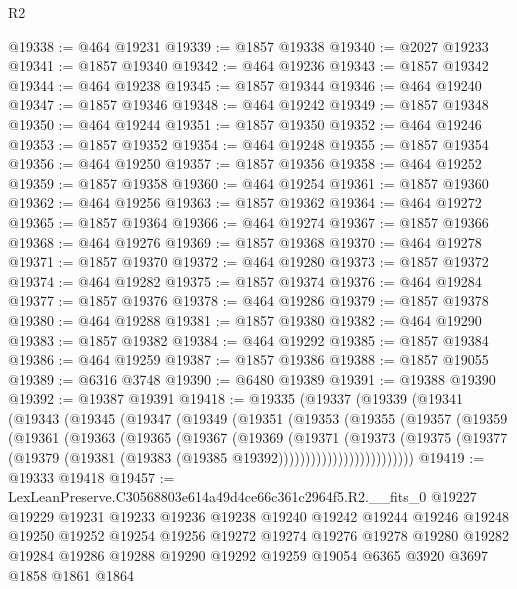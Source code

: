 \begin{lexlean}{R2}
\begin{coremodule}
@19338 := @464 @19231
@19339 := @1857 @19338
@19340 := @2027 @19233
@19341 := @1857 @19340
@19342 := @464 @19236
@19343 := @1857 @19342
@19344 := @464 @19238
@19345 := @1857 @19344
@19346 := @464 @19240
@19347 := @1857 @19346
@19348 := @464 @19242
@19349 := @1857 @19348
@19350 := @464 @19244
@19351 := @1857 @19350
@19352 := @464 @19246
@19353 := @1857 @19352
@19354 := @464 @19248
@19355 := @1857 @19354
@19356 := @464 @19250
@19357 := @1857 @19356
@19358 := @464 @19252
@19359 := @1857 @19358
@19360 := @464 @19254
@19361 := @1857 @19360
@19362 := @464 @19256
@19363 := @1857 @19362
@19364 := @464 @19272
@19365 := @1857 @19364
@19366 := @464 @19274
@19367 := @1857 @19366
@19368 := @464 @19276
@19369 := @1857 @19368
@19370 := @464 @19278
@19371 := @1857 @19370
@19372 := @464 @19280
@19373 := @1857 @19372
@19374 := @464 @19282
@19375 := @1857 @19374
@19376 := @464 @19284
@19377 := @1857 @19376
@19378 := @464 @19286
@19379 := @1857 @19378
@19380 := @464 @19288
@19381 := @1857 @19380
@19382 := @464 @19290
@19383 := @1857 @19382
@19384 := @464 @19292
@19385 := @1857 @19384
@19386 := @464 @19259
@19387 := @1857 @19386
@19388 := @1857 @19055
@19389 := @6316 @3748
@19390 := @6480 @19389
@19391 := @19388 @19390
@19392 := @19387 @19391
@19418 := @19335
    (@19337
      (@19339
        (@19341
          (@19343
            (@19345
              (@19347
                (@19349
                  (@19351
                    (@19353
                      (@19355
                        (@19357
                          (@19359
                            (@19361
                              (@19363
                                (@19365
                                  (@19367
                                    (@19369
                                      (@19371
                                        (@19373
                                          (@19375
                                            (@19377
                                              (@19379
                                                (@19381
                                                  (@19383 (@19385 @19392)))))))))))))))))))))))))
@19419 := @19333 @19418
@19457 := LexLeanPreserve.C30568803e614a49d4ce66c361c2964f5.R2.__fits_0
    @19227
    @19229
    @19231
    @19233
    @19236
    @19238
    @19240
    @19242
    @19244
    @19246
    @19248
    @19250
    @19252
    @19254
    @19256
    @19272
    @19274
    @19276
    @19278
    @19280
    @19282
    @19284
    @19286
    @19288
    @19290
    @19292
    @19259
    @19054
    @6365
    @3920
    @3697
    @1858
    @1861
    @1864

\end{coremodule}
\end{lexlean}
